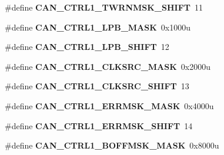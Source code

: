 \begin{DoxyCompactItemize}
\item 
\hypertarget{group___c_a_n___register___masks_gaf1bd84bad38306a14085dc57cb8728bf}{}\#define {\bfseries C\+A\+N\+\_\+\+C\+T\+R\+L1\+\_\+\+T\+W\+R\+N\+M\+S\+K\+\_\+\+S\+H\+I\+F\+T}~11\label{group___c_a_n___register___masks_gaf1bd84bad38306a14085dc57cb8728bf}

\item 
\hypertarget{group___c_a_n___register___masks_ga6c3587074ec8b0646ec8c99f659bc90b}{}\#define {\bfseries C\+A\+N\+\_\+\+C\+T\+R\+L1\+\_\+\+L\+P\+B\+\_\+\+M\+A\+S\+K}~0x1000u\label{group___c_a_n___register___masks_ga6c3587074ec8b0646ec8c99f659bc90b}

\item 
\hypertarget{group___c_a_n___register___masks_ga61cd46b497234d979cda54fa0952b848}{}\#define {\bfseries C\+A\+N\+\_\+\+C\+T\+R\+L1\+\_\+\+L\+P\+B\+\_\+\+S\+H\+I\+F\+T}~12\label{group___c_a_n___register___masks_ga61cd46b497234d979cda54fa0952b848}

\item 
\hypertarget{group___c_a_n___register___masks_ga24eac1a19c79f750c2ed88506155179d}{}\#define {\bfseries C\+A\+N\+\_\+\+C\+T\+R\+L1\+\_\+\+C\+L\+K\+S\+R\+C\+\_\+\+M\+A\+S\+K}~0x2000u\label{group___c_a_n___register___masks_ga24eac1a19c79f750c2ed88506155179d}

\item 
\hypertarget{group___c_a_n___register___masks_gaba9b9a37df4f732cbd5b994aafe50eed}{}\#define {\bfseries C\+A\+N\+\_\+\+C\+T\+R\+L1\+\_\+\+C\+L\+K\+S\+R\+C\+\_\+\+S\+H\+I\+F\+T}~13\label{group___c_a_n___register___masks_gaba9b9a37df4f732cbd5b994aafe50eed}

\item 
\hypertarget{group___c_a_n___register___masks_ga108c8ae37e8122ea29d48b9e68fbcc43}{}\#define {\bfseries C\+A\+N\+\_\+\+C\+T\+R\+L1\+\_\+\+E\+R\+R\+M\+S\+K\+\_\+\+M\+A\+S\+K}~0x4000u\label{group___c_a_n___register___masks_ga108c8ae37e8122ea29d48b9e68fbcc43}

\item 
\hypertarget{group___c_a_n___register___masks_ga16b53de26664898f76f1cd545181782b}{}\#define {\bfseries C\+A\+N\+\_\+\+C\+T\+R\+L1\+\_\+\+E\+R\+R\+M\+S\+K\+\_\+\+S\+H\+I\+F\+T}~14\label{group___c_a_n___register___masks_ga16b53de26664898f76f1cd545181782b}

\item 
\hypertarget{group___c_a_n___register___masks_gafda1924bc397205b585b128187af9634}{}\#define {\bfseries C\+A\+N\+\_\+\+C\+T\+R\+L1\+\_\+\+B\+O\+F\+F\+M\+S\+K\+\_\+\+M\+A\+S\+K}~0x8000u\label{group___c_a_n___register___masks_gafda1924bc397205b585b128187af9634}


\end{DoxyCompactItemize}
